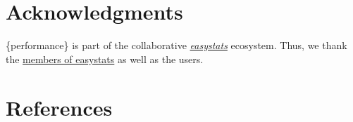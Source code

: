\documentclass[
]{article}
\begin{document}
\hypertarget{acknowledgments}{%
\section{Acknowledgments}\label{acknowledgments}}

\{performance\} is part of the collaborative
\href{https://github.com/easystats/easystats}{\emph{easystats}}
ecosystem. Thus, we thank the
\href{https://github.com/orgs/easystats/people}{members of easystats} as
well as the users.

\hypertarget{references}{%
\section*{References}\label{references}}
\end{document}
